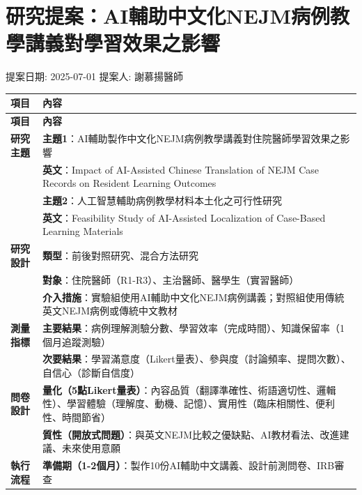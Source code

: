 \documentclass[a4paper,10pt]{article}
\begin{document}
\section*{研究提案：AI輔助中文化NEJM病例教學講義對學習效果之影響}
\noindent 提案日期: 2025-07-01
\noindent 提案人: 謝慕揚醫師

\vspace{1cm}

\begin{longtable}{>{\raggedright\arraybackslash}p{2cm}>{\raggedright\arraybackslash}p{12cm}}
\toprule
\textbf{項目} & \textbf{內容} \\
\midrule
\endfirsthead
\toprule
\textbf{項目} & \textbf{內容} \\
\midrule
\endhead
\textbf{研究主題} & \textbf{主題1}：AI輔助製作中文化NEJM病例教學講義對住院醫師學習效果之影響 \\
& \textbf{英文}：Impact of AI-Assisted Chinese Translation of NEJM Case Records on Resident Learning Outcomes \\
& \textbf{主題2}：人工智慧輔助病例教學材料本土化之可行性研究 \\
& \textbf{英文}：Feasibility Study of AI-Assisted Localization of Case-Based Learning Materials \\
\midrule
\textbf{研究設計} & \textbf{類型}：前後對照研究、混合方法研究 \\
& \textbf{對象}：住院醫師（R1-R3）、主治醫師、醫學生（實習醫師） \\
& \textbf{介入措施}：實驗組使用AI輔助中文化NEJM病例講義；對照組使用傳統英文NEJM病例或傳統中文教材 \\
\midrule
\textbf{測量指標} & \textbf{主要結果}：病例理解測驗分數、學習效率（完成時間）、知識保留率（1個月追蹤測驗） \\
& \textbf{次要結果}：學習滿意度（Likert量表）、參與度（討論頻率、提問次數）、自信心（診斷自信度） \\
\midrule
\textbf{問卷設計} & \textbf{量化（5點Likert量表）}：內容品質（翻譯準確性、術語適切性、邏輯性）、學習體驗（理解度、動機、記憶）、實用性（臨床相關性、便利性、時間節省） \\
& \textbf{質性（開放式問題）}：與英文NEJM比較之優缺點、AI教材看法、改進建議、未來使用意願 \\
\midrule
\textbf{執行流程} & \textbf{準備期（1-2個月）}：製作10份AI輔助中文講義、設計前測問卷、IRB審查 \\

\end{longtable}
\end{document}
